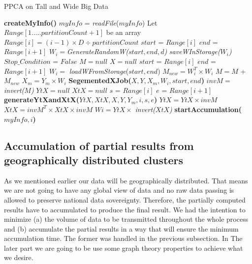 \documentclass[10pt,conference,letterpaper]{IEEEtran}
\begin{document}
\newcommand\tab[1][.5cm]{\hspace*{#1}}
\begin{algorithm} [!htbp]
	\label{tallnwide}
  \caption{PPCA on Tall and Wide Big Data}
  \begin{algorithmic}[1]
  \State \textbf{createMyInfo()}
  \State $myInfo$ = \textit{readFile}($myInfo$)
  \State Let $Range[1.....partitionCount+1]$ be an array %
  	\State $Range[i] = (i-1)\times D \div partitionCount$
  \EndFor
  		\State $start$ = $Range[i]$  
		\State $end$ = $Range[i+1]$ 
		\State $W_i = $\textit{GenerateRandomW($start, end, d$)}
		\State \textit{saveWInStorage($W_i$)}
  \EndFor
  \State $Stop\_Condition$ = $False$
  	  \State $M = null$ 
  \State $X = null$
		\State $start$ = $Range[i]$  
		\State $end$ = $Range[i+1]$  
		\State $W_i =$ \textit{loadWFromStorage}($start, end$)
		\State $M_{new} = W_i^T \times W_i$
		\State $M = M$ + $M_{new}$
		\State $X_m = Y_m \times W_i$
		\State \textbf{SegementedXJob($X, Y, X_m, W_i, start, end$)}
	\EndFor
	\State $invM = $\textit{invert($M$)}
	\State $YtX = null$
	\State $XtX = null$
		\State $s$ = $Range[i]$  
		\State $e$ = $Range[i+1]$  
		\State \textbf{generateYtXandXtX($YtX,XtX,X,Y,Y_m,i,s,e$)}
		\State $YtX = YtX \times invM$
		\State $XtX = invM^T \times XtX \times invM$
		\State $Wi = YtX \times $ \textit{invert($XtX$)}
		\State \textbf{startAccumulation($myInfo, i$)}
	\EndFor
  \EndWhile
  \end{algorithmic}
\end{algorithm}


\subsection{Accumulation of partial results from geographically distributed clusters}
As we mentioned earlier our data will be geographically distributed. That means we are not going to have any global view of data and no raw data passing is allowed to preserve national data sovereignty. Therefore, the partially computed results have to accumulated to produce the final result. We had the intention to minimize (a) the volume of data to be transmitted throughout the whole process and (b) accumulate the partial results in a way that will ensure the minimum accumulation time.
The former was handled in the previous subsection. In The later part we are going to be use some graph theory properties to achieve what we desire.
\end{document}
